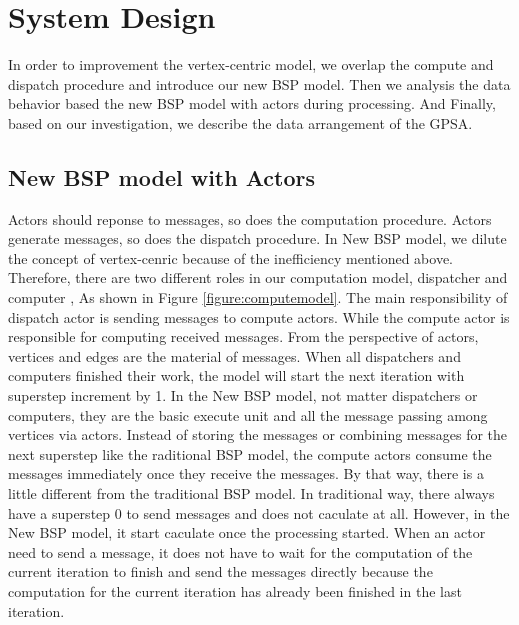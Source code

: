 \documentclass[twocolumn,a4paper,10pt]{article}
\begin{document}
\section{System Design}

In order to improvement the vertex-centric model, we overlap the compute and dispatch procedure and introduce our new BSP model. Then we analysis the data behavior based the new BSP model with actors during processing. And Finally, based on our investigation, we describe the data arrangement of the GPSA.

\subsection{New BSP model with Actors}
 
Actors should reponse to messages, so does the computation procedure. Actors generate messages, so does the dispatch procedure. In New BSP model, we dilute the concept of vertex-cenric because of the inefficiency mentioned above. Therefore, there are two different roles in our computation model, dispatcher and computer , As shown in Figure \ref{figure:computemodel}. The main responsibility of dispatch actor is sending messages to compute actors. While the compute actor is responsible for computing received messages. From the perspective of actors, vertices and edges are the material of messages. When all dispatchers and computers finished their work, the model will start the next iteration with superstep increment by 1. In the New BSP model, not matter dispatchers or computers, they are the basic execute unit and all the message passing among vertices via actors. Instead of storing the messages or combining messages for the next superstep like the raditional BSP model, the compute actors consume the messages immediately once they receive the messages. By that way, there is a little different from the traditional BSP model. In traditional way, there always have a superstep 0 to send messages and does not caculate at all. However, in the New BSP model, it start caculate once the processing started. When an actor need to send a message, it does not have to wait for the computation of the current iteration to finish and send the messages directly because the computation for the current iteration has already been finished in the last iteration. \newline
\end{document}
